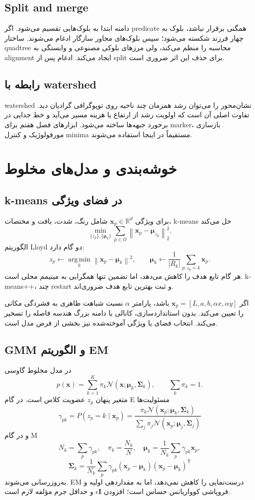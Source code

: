 \documentclass[12pt,openany,oneside]{book}
\newcommand{\R}{\mathbb{R}}
\newcommand{\norm}[1]{\left\lVert #1\right\rVert}
\newcommand{\trans}{^{\mathsf T}}
\newcommand{\vect}[1]{\bm{#1}}
\newcommand{\mat}[1]{\bm{#1}}
\newcommand{\argmin}{\operatorname*{arg\,min}}
\begin{document}
\subsection{Split and merge}
دامنه ابتدا به بلوک‌هایی تقسیم می‌شود. اگر predicate همگنی برقرار نباشد، بلوک به چهار فرزند شکسته می‌شود؛ سپس
بلوک‌های مجاور سازگار ادغام می‌شوند. ساختار quadtree محاسبه را منظم می‌کند، ولی مرزهای بلوکی مصنوعی و وابستگی
به alignment ایجاد می‌کند. ادغام پس از split برای حذف این اثر ضروری است.

\subsection{رابطه با watershed}
watershed نشان‌محور را می‌توان رشد همزمان چند ناحیه روی توپوگرافی گرادیان دید. تفاوت اصلی آن است که اولویت رشد
از ارتفاع یا هزینه مسیر می‌آید و خط جدایی در برخورد جبهه‌ها ساخته می‌شود. ابزارهای فصل هفتم برای marker، بازسازی
مورفولوژیک و کنترل minima مستقیماً در اینجا استفاده می‌شوند.

\section{خوشه‌بندی و مدل‌های مخلوط}
\subsection{k-means در فضای ویژگی}
برای ویژگی \(\vect x_p\in\R^d\) شامل رنگ، شدت، بافت و مختصات، k-means حل می‌کند
\[
\min_{\{z_p\},\{\vect\mu_k\}}
\sum_{p\in\Omega}\norm{\vect x_p-\vect\mu_{z_p}}_2^2.
\]
الگوریتم Lloyd دو گام دارد:
\[
z_p\leftarrow\argmin_k\norm{\vect x_p-\vect\mu_k}^2,
\qquad
\vect\mu_k\leftarrow\frac{1}{|R_k|}\sum_{p:z_p=k}\vect x_p.
\]
هر گام تابع هدف را کاهش می‌دهد، اما تضمین تنها همگرایی به مینیمم محلی است. k-means++، چند restart و ثبت بهترین
تابع هدف ضروری‌اند.

\begin{keybox}
اگر \(\vect x_p=[L,a,b,\alpha x,\alpha y]\) باشد، پارامتر \(\alpha\) نسبت شباهت ظاهری به فشردگی مکانی را
تعیین می‌کند. بدون استانداردسازی، کانالی با دامنه بزرگ هندسه فاصله را تسخیر می‌کند. انتخاب فضای  یا ویژگی
آموخته‌شده نیز بخشی از فرض مدل است.
\end{keybox}

\subsection{GMM و الگوریتم EM}
در مدل مخلوط گاوسی
\[
p(\vect x)=\sum_{k=1}^{K}\pi_k\mathcal N(\vect x;\vect\mu_k,\mat\Sigma_k),
\qquad \sum_k\pi_k=1.
\]
متغیر پنهان \(z_p\) عضویت کلاس است. در گام E مسئولیت‌ها
\[
\gamma_{pk}=P(z_p=k\mid\vect x_p)
=\frac{\pi_k\mathcal N(\vect x_p;\vect\mu_k,\mat\Sigma_k)}
{\sum_j\pi_j\mathcal N(\vect x_p;\vect\mu_j,\mat\Sigma_j)}
\]
و در گام M
\[
N_k=\sum_p\gamma_{pk},\quad
\pi_k=\frac{N_k}{N},\quad
\vect\mu_k=\frac{1}{N_k}\sum_p\gamma_{pk}\vect x_p,
\]
\[
\mat\Sigma_k=\frac{1}{N_k}\sum_p\gamma_{pk}
(\vect x_p-\vect\mu_k)(\vect x_p-\vect\mu_k)\trans
\]
به‌روزرسانی می‌شوند. EM درست‌نمایی را کاهش نمی‌دهد، اما به مقداردهی اولیه و فروپاشی کوواریانس حساس است؛ افزودن
\(\epsilon\mat I\) و حداقل جرم مؤلفه لازم است.
\end{document}
